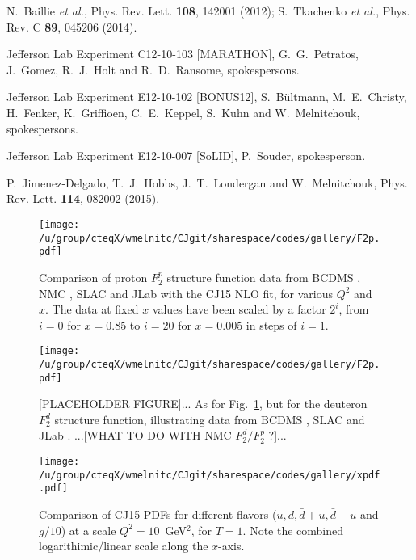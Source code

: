 \documentclass[aps,prd,amsmath,preprint]{revtex4}
\begin{document}
\begin{thebibliography}{99}
N.~Baillie {\it et al.},
Phys. Rev. Lett. {\bf 108}, 142001 (2012);
%
S.~Tkachenko {\it et al.},
Phys. Rev. C {\bf 89}, 045206 (2014).

Jefferson Lab Experiment C12-10-103 [MARATHON],
G.~G.~Petratos, J.~Gomez, R.~J.~Holt and R.~D.~Ransome,
spokespersons.
 
Jefferson Lab Experiment E12-10-102 [BONUS12],
S.~B\"ultmann, M.~E.~Christy, H.~Fenker, K.~Griffioen, C.~E.~Keppel,
S.~Kuhn and W.~Melnitchouk,
spokespersons.
 
Jefferson Lab Experiment E12-10-007 [SoLID],
P.~Souder, spokesperson.

P.~Jimenez-Delgado, T.~J.~Hobbs, J.~T.~Londergan and W.~Melnitchouk,
Phys. Rev. Lett. {\bf 114}, 082002 (2015).

\end{thebibliography}


\begin{figure}[t]
\texttt{[image: /u/group/cteqX/wmelnitc/CJgit/sharespace/codes/gallery/F2p.pdf]}
\caption{Comparison of proton $F_2^p$ structure function data
	from BCDMS \cite{BCDMS}, NMC \cite{NMCp},
	SLAC \cite{SLAC} and JLab \cite{Malace}
	with the CJ15 NLO fit, for various $Q^2$ and $x$.
	The data at fixed $x$ values have been scaled by a factor
	$2^i$, from $i=0$ for $x=0.85$ to $i=20$ for $x=0.005$
	in steps of $i=1$.}
\label{fig:F2p}
\end{figure} 


\begin{figure}[t]
\texttt{[image: /u/group/cteqX/wmelnitc/CJgit/sharespace/codes/gallery/F2p.pdf]}
\caption{{\color{red}[PLACEHOLDER FIGURE]...}
	As for Fig.~\ref{fig:F2p}, but for the deuteron $F_2^d$
	structure function, illustrating data from BCDMS \cite{BCDMS},
	SLAC \cite{SLAC} and JLab \cite{Malace}.
	{\color{red}...[WHAT TO DO WITH NMC $F_2^d/F_2^p$ ?]...}}
\label{fig:F2d}
\end{figure} 


\begin{figure}[t]
\texttt{[image: /u/group/cteqX/wmelnitc/CJgit/sharespace/codes/gallery/xpdf.pdf]}
\caption{Comparison of CJ15 PDFs for different flavors
	($u, d, \bar d + \bar u, \bar d - \bar u$ and $g/10$)
	at a scale $Q^2=10$~GeV$^2$, for $T=1$.
	Note the combined logarithimic/linear scale along the $x$-axis.}
\label{fig:pdf}
\end{figure} 
\end{document}
